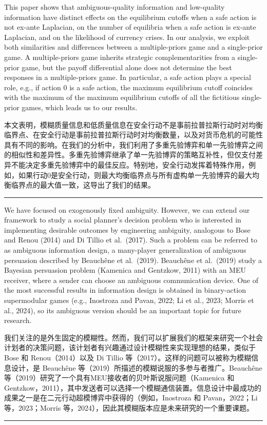 \documentclass[12pt,a4paper]{article}
\newenvironment{original}
  {\par\medskip\noindent\color{black}\ignorespaces}
  {\par\medskip}
\newenvironment{translation}
  {\par\noindent\color{darkblue}\ignorespaces}
  {\par\medskip\noindent\hrule\par\medskip}
\theoremstyle{definition}
\theoremstyle{remark}
\begin{document}
\begin{original}
This paper shows that ambiguous-quality information and low-quality information have distinct effects on the equilibrium cutoffs when a safe action is not ex-ante Laplacian, on the number of equilibria when a safe action is ex-ante Laplacian, and on the likelihood of currency crises. In our analysis, we exploit both similarities and differences between a multiple-priors game and a single-prior game. A multiple-priors game inherits strategic complementarities from a single-prior game, but the payoff differential alone does not determine the best responses in a multiple-priors game. In particular, a safe action plays a special role, e.g., if action 0 is a safe action, the maximum equilibrium cutoff coincides with the maximum of the maximum equilibrium cutoffs of all the fictitious single-prior games, which leads us to our results.
\end{original}
\begin{translation}
本文表明，模糊质量信息和低质量信息在安全行动不是事前拉普拉斯行动时对均衡临界点、在安全行动是事前拉普拉斯行动时对均衡数量，以及对货币危机的可能性具有不同的影响。在我们的分析中，我们利用了多重先验博弈和单一先验博弈之间的相似性和差异性。多重先验博弈继承了单一先验博弈的策略互补性，但仅支付差异不能决定多重先验博弈中的最佳反应。特别地，安全行动发挥着特殊作用，例如，如果行动0是安全行动，则最大均衡临界点与所有虚构单一先验博弈的最大均衡临界点的最大值一致，这导出了我们的结果。
\end{translation}

\begin{original}
We have focused on exogenously fixed ambiguity. However, we can extend our framework to study a social planner's decision problem who is interested in implementing desirable outcomes by engineering ambiguity, analogous to Bose and Renou (2014) and Di Tillio et al.\ (2017). Such a problem can be referred to as ambiguous information design, a many-player generalization of ambiguous persuasion described by Beauch\^ene et al.\ (2019). Beauch\^ene et al.\ (2019) study a Bayesian persuasion problem (Kamenica and Gentzkow, 2011) with an MEU receiver, where a sender can choose an ambiguous communication device. One of the most successful results in information design is obtained in binary-action supermodular games (e.g., Inostroza and Pavan, 2022; Li et al., 2023; Morris et al., 2024), so its ambiguous version should be an important topic for future research.
\end{original}
\begin{translation}
我们关注的是外生固定的模糊性。然而，我们可以扩展我们的框架来研究一个社会计划者的决策问题，该计划者有兴趣通过设计模糊性来实现理想的结果，类似于 Bose 和 Renou（2014）以及 Di Tillio 等（2017）。这样的问题可以被称为模糊信息设计，是 Beauch\^ene 等（2019）所描述的模糊说服的多参与者推广。Beauch\^ene 等（2019）研究了一个具有MEU接收者的贝叶斯说服问题（Kamenica 和 Gentzkow，2011），其中发送者可以选择一个模糊通信装置。信息设计中最成功的成果之一是在二元行动超模博弈中获得的（例如，Inostroza 和 Pavan，2022；Li 等，2023；Morris 等，2024），因此其模糊版本应是未来研究的一个重要课题。
\end{translation}
\end{document}
